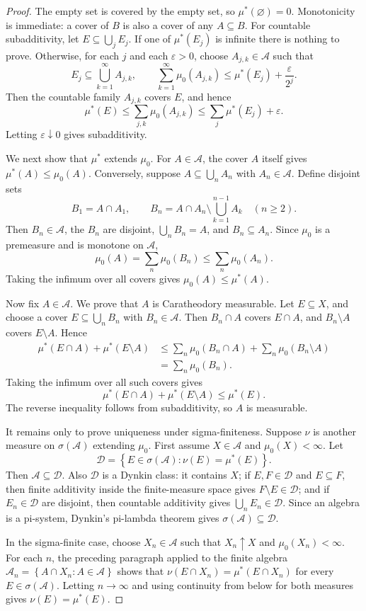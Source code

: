 \documentclass[11pt,openany]{book}
\numberwithin{equation}{chapter}
\theoremstyle{definition}
\theoremstyle{plain}
\theoremstyle{remark}
\newcommand{\A}{\mathcal{A}}
\newcommand{\eps}{\varepsilon}
\newcommand{\1}{\mathbf{1}}
\newcommand{\set}[1]{\left\{#1\right\}}
\begin{document}
\begin{proof}
The empty set is covered by the empty set, so \(\mu^*(\varnothing)=0\). Monotonicity is immediate: a cover of \(B\) is also a cover of any \(A\subseteq B\). For countable subadditivity, let \(E\subseteq\bigcup_jE_j\). If one of \(\mu^*(E_j)\) is infinite there is nothing to prove. Otherwise, for each \(j\) and each \(\eps>0\), choose \(A_{j,k}\in\A\) such that
\[
  E_j\subseteq\bigcup_{k=1}^{\infty}A_{j,k},
  \qquad
  \sum_{k=1}^{\infty}\mu_0(A_{j,k})\leq\mu^*(E_j)+\frac{\eps}{2^j}.
\]
Then the countable family \(A_{j,k}\) covers \(E\), and hence
\[
  \mu^*(E)\leq \sum_{j,k}\mu_0(A_{j,k})
  \leq \sum_j\mu^*(E_j)+\eps.
\]
Letting \(\eps\downarrow0\) gives subadditivity.

We next show that \(\mu^*\) extends \(\mu_0\). For \(A\in\A\), the cover \(A\) itself gives \(\mu^*(A)\leq\mu_0(A)\). Conversely, suppose \(A\subseteq\bigcup_nA_n\) with \(A_n\in\A\). Define disjoint sets
\[
  B_1=A\cap A_1,
  \qquad
  B_n=A\cap A_n\setminus\bigcup_{k=1}^{n-1}A_k\quad(n\geq2).
\]
Then \(B_n\in\A\), the \(B_n\) are disjoint, \(\bigcup_nB_n=A\), and \(B_n\subseteq A_n\). Since \(\mu_0\) is a premeasure and is monotone on \(\A\),
\[
  \mu_0(A)=\sum_n\mu_0(B_n)\leq\sum_n\mu_0(A_n).
\]
Taking the infimum over all covers gives \(\mu_0(A)\leq\mu^*(A)\).

Now fix \(A\in\A\). We prove that \(A\) is Caratheodory measurable. Let \(E\subseteq X\), and choose a cover \(E\subseteq\bigcup_nB_n\) with \(B_n\in\A\). Then \(B_n\cap A\) covers \(E\cap A\), and \(B_n\setminus A\) covers \(E\setminus A\). Hence
\begin{align*}
\mu^*(E\cap A)+\mu^*(E\setminus A)
&\leq\sum_n\mu_0(B_n\cap A)+\sum_n\mu_0(B_n\setminus A)\\
&=\sum_n\mu_0(B_n).
\end{align*}
Taking the infimum over all such covers gives
\[
  \mu^*(E\cap A)+\mu^*(E\setminus A)\leq\mu^*(E).
\]
The reverse inequality follows from subadditivity, so \(A\) is measurable.

It remains only to prove uniqueness under sigma-finiteness. Suppose \(\nu\) is another measure on \(\sigma(\A)\) extending \(\mu_0\). First assume \(X\in\A\) and \(\mu_0(X)<\infty\). Let
\[
  \mathcal D=\set{E\in\sigma(\A): \nu(E)=\mu^*(E)}.
\]
Then \(\A\subseteq\mathcal D\). Also \(\mathcal D\) is a Dynkin class: it contains \(X\); if \(E,F\in\mathcal D\) and \(E\subseteq F\), then finite additivity inside the finite-measure space gives \(F\setminus E\in\mathcal D\); and if \(E_n\in\mathcal D\) are disjoint, then countable additivity gives \(\bigcup_nE_n\in\mathcal D\). Since an algebra is a pi-system, Dynkin's pi-lambda theorem gives \(\sigma(\A)\subseteq\mathcal D\).

In the sigma-finite case, choose \(X_n\in\A\) such that \(X_n\uparrow X\) and \(\mu_0(X_n)<\infty\). For each \(n\), the preceding paragraph applied to the finite algebra \(\A_n=\set{A\cap X_n:A\in\A}\) shows that \(\nu(E\cap X_n)=\mu^*(E\cap X_n)\) for every \(E\in\sigma(\A)\). Letting \(n\to\infty\) and using continuity from below for both measures gives \(\nu(E)=\mu^*(E)\).
\end{proof}
\end{document}
